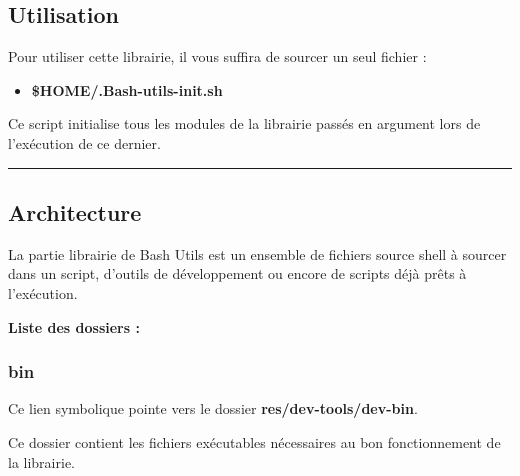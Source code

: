 \documentclass[a4paper,10pt]{article}
\begin{document}
\subsection{Utilisation}\color{white}

\begin{justify}
    Pour utiliser cette librairie, il vous suffira de sourcer un seul fichier :

    \begin{itemize}
        \item \textbf{\color{orange}\$HOME\color{lime}/.Bash-utils-init.sh}
    \end{itemize}
\end{justify}

\begin{justify}
    Ce script initialise tous les modules de la librairie passés en argument lors de l'exécution de ce dernier.
\end{justify}




\color{green}\par\noindent\rule{\textwidth}{0.4pt}\color{white}

\color{green}
\subsection{Architecture}\color{white}

\begin{justify}
    La partie librairie de Bash Utils est un ensemble de fichiers source shell à sourcer dans un script, d'outils de développement ou encore de scripts déjà prêts à l'exécution.
\end{justify}


\textbf{Liste des dossiers :}

\color{blue}
\subsubsection{bin}\color{white}

\begin{justify}
    Ce lien symbolique pointe vers le dossier \textbf{\color{lime}res/dev-tools/dev-bin}.
\end{justify}

\begin{justify}
    Ce dossier contient les fichiers exécutables nécessaires au bon fonctionnement de la librairie.
\end{justify}
\end{document}
